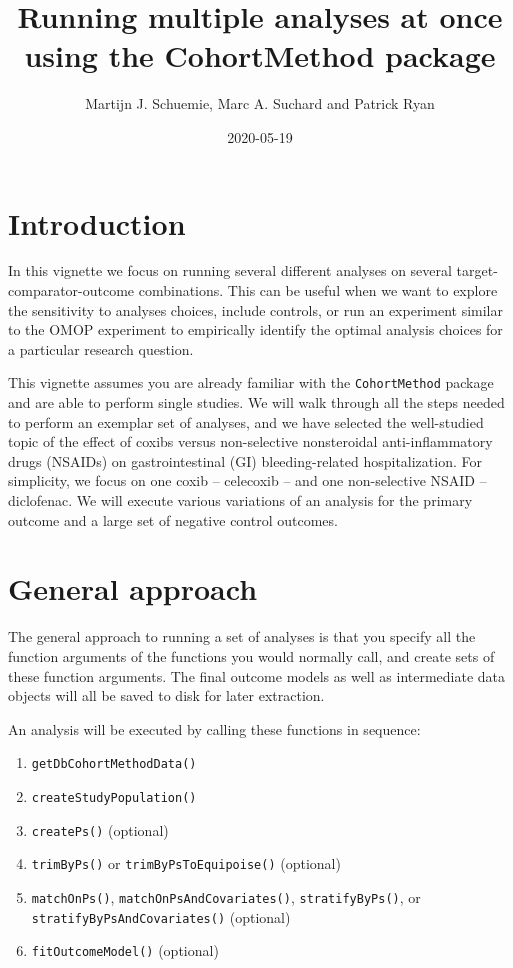 \documentclass[
]{article}
\title{Running multiple analyses at once using the CohortMethod package}
\author{Martijn J. Schuemie, Marc A. Suchard and Patrick Ryan}
\date{2020-05-19}
\providecommand{\tightlist}{%
  \setlength{\itemsep}{0pt}\setlength{\parskip}{0pt}}
\begin{document}
\maketitle

{
\setcounter{tocdepth}{2}
\tableofcontents
}
\hypertarget{introduction}{%
\section{Introduction}\label{introduction}}

In this vignette we focus on running several different analyses on
several target-comparator-outcome combinations. This can be useful when
we want to explore the sensitivity to analyses choices, include
controls, or run an experiment similar to the OMOP experiment to
empirically identify the optimal analysis choices for a particular
research question.

This vignette assumes you are already familiar with the
\texttt{CohortMethod} package and are able to perform single studies. We
will walk through all the steps needed to perform an exemplar set of
analyses, and we have selected the well-studied topic of the effect of
coxibs versus non-selective nonsteroidal anti-inflammatory drugs
(NSAIDs) on gastrointestinal (GI) bleeding-related hospitalization. For
simplicity, we focus on one coxib -- celecoxib -- and one non-selective
NSAID -- diclofenac. We will execute various variations of an analysis
for the primary outcome and a large set of negative control outcomes.

\hypertarget{general-approach}{%
\section{General approach}\label{general-approach}}

The general approach to running a set of analyses is that you specify
all the function arguments of the functions you would normally call, and
create sets of these function arguments. The final outcome models as
well as intermediate data objects will all be saved to disk for later
extraction.

An analysis will be executed by calling these functions in sequence:

\begin{enumerate}
\def\labelenumi{\arabic{enumi}.}
\tightlist
\item
  \texttt{getDbCohortMethodData()}
\item
  \texttt{createStudyPopulation()}
\item
  \texttt{createPs()} (optional)
\item
  \texttt{trimByPs()} or \texttt{trimByPsToEquipoise()} (optional)
\item
  \texttt{matchOnPs()}, \texttt{matchOnPsAndCovariates()},
  \texttt{stratifyByPs()}, or \texttt{stratifyByPsAndCovariates()}
  (optional)
\item
  \texttt{fitOutcomeModel()} (optional)
\end{enumerate}
\end{document}
